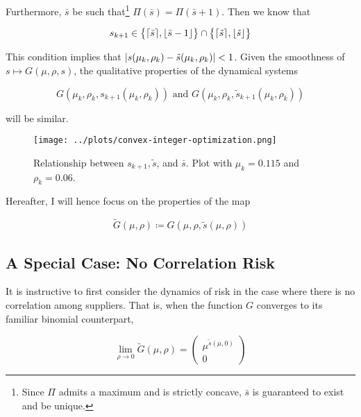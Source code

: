 \documentclass[../../main.tex]{subfiles}
\begin{document}
Furthermore, $\bar{s}$ be such that\footnote{Since $\Pi$ admits a maximum and is strictly concave, $\bar{s}$ is guaranteed to exist and be unique.} $\Pi(\bar{s}) = \Pi(\bar{s} + 1)$. Then we know that 

\begin{equation}
  s_{k + 1} \in \big\{ \lceil\bar{s}\rceil, \lfloor\bar{s} - 1\rfloor \big\} \cap \big\{ \lceil\tilde{s}\rceil, \lfloor\tilde{s}\rfloor \big\}
\end{equation}

This condition implies that $\left\lvert s(\mu_k, \rho_k) - \tilde{s}(\mu_k, \rho_k)\right\rvert < 1$. Given the smoothness of $s \mapsto G(\mu, \rho, s)$, the qualitative properties of the dynamical systems

\begin{equation*}
    G(\mu_k, \rho_k, s_{k + 1}(\mu_k, \rho_k)) \text{ and } G(\mu_k, \rho_k, \tilde{s}_{k + 1}(\mu_k, \rho_k))
\end{equation*}

will be similar.


\begin{figure}[H]
  \centering
  \texttt{[image: ../plots/convex-integer-optimization.png]}
  \caption{Relationship between $s_{k + 1}, \tilde{s}$, and $\bar{s}$. Plot with $\mu_k = 0.115$ and $\rho_k = 0.06$.}
  \label{fig:convex-integer-optimization}
\end{figure}

Hereafter, I will hence focus on the properties of the map

\begin{equation}
  \tilde{G}(\mu, \rho) \coloneqq G(\mu, \rho, \tilde{s}(\mu, \rho))
\end{equation}

\subsection{A Special Case: No Correlation Risk}

It is instructive to first consider the dynamics of risk in the case where there is no correlation among suppliers. That is, when the function $G$ converges to its familiar binomial counterpart,

\begin{equation}
   \lim_{\rho \rightarrow 0} \tilde{G}(\mu, \rho) = \begin{pmatrix} \mu^{\tilde{s}(\mu, 0)} \\ 0 \end{pmatrix} 
\end{equation}
\end{document}
